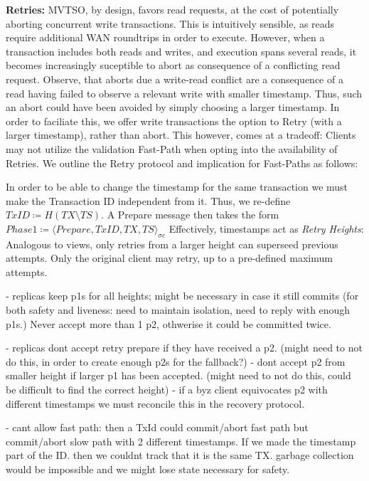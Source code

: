 \textbf{Retries:} MVTSO, by design, favors read requests, at the cost of potentially aborting concurrent write transactions. This is intuitively sensible, as reads require additional WAN roundtrips in order to execute. 
However, when a transaction includes both reads and writes, and execution spans several reads, it becomes increasingly suceptible to abort as consequence of a conflicting read request. Observe, that aborts due a write-read conflict are a consequence of a read having failed to observe a relevant write with smaller timestamp. Thus, such an abort could have been avoided by simply choosing a larger timestamp. In order to faciliate this, we offer write transactions the option to Retry (with a larger timestamp), rather than abort. This however, comes at a tradeoff: Clients may not utilize the validation Fast-Path when opting into the availability of Retries. We outline the Retry protocol and implication for Fast-Paths as follows:

In order to be able to change the timestamp for the same transaction we must make the Transaction ID independent from it. Thus, we re-define $TxID \coloneqq H(TX \setminus TS)$. A Prepare message then takes the form $Phase1 \coloneqq \langle Prepare, TxID, TX, TS \rangle_{\sigma c}$
Effectively, timestamps act as \textit{Retry Heights}: Analogous to views, only retries from a larger height can superseed previous attempts. Only the original client may retry, up to a pre-defined maximum attempts.


- replicas keep p1s for all heights; might be necessary in case it still commits (for both safety and liveness: need to maintain isolation, need to reply with enough p1s.)
Never accept more than 1 p2, othwerise it could be committed twice.

- replicas dont accept retry prepare if they have received a p2. (might need to not do this, in order to create enough p2s for the fallback?)
- dont accept p2 from smaller height if larger p1 has been accepted. (might need to not do this, could be difficult to find the correct height)
- if a byz client equivocates p2 with different timestamps we must reconcile this in the recovery protocol. 

- cant allow fast path: then a TxId could commit/abort fast path but commit/abort slow path with 2 different timestamps. If we made the timestamp part of the ID. then we couldnt track that it is the same TX. garbage collection would be impossible and we might lose state necessary for safety.

